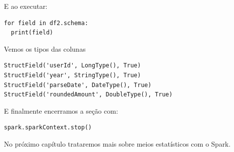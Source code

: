 E ao executar:
\begin{lstlisting}[]
for field in df2.schema:
  print(field)
\end{lstlisting}

Vemos os tipos das colunas
\begin{verbatim}
StructField('userId', LongType(), True)
StructField('year', StringType(), True)
StructField('parseDate', DateType(), True)
StructField('roundedAmount', DoubleType(), True)	
\end{verbatim}

E finalmente encerramos a seção com:
\begin{lstlisting}[]
spark.sparkContext.stop()
\end{lstlisting}

No próximo capítulo trataremos mais sobre meios estatísticos com o Spark.
\clearpage